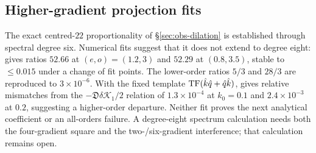 \subsection{Higher-gradient projection fits}\label{app:projection-fits}
The exact centred-$22$ proportionality of \S\ref{sec:obs-dilation} is established through
spectral degree six. Numerical fits suggest that it does not extend to degree eight:
 gives ratios $52.66$ at $(e,o)=(1.2,3)$ and
$52.29$ at $(0.8,3.5)$, stable to $\le0.015$ under a change of fit points. The lower-order
ratios $5/3$ and $28/3$ are reproduced to $3\times10^{-6}$.
With the fixed template $\operatorname{TF}(\hat k\hat q+\hat q\hat k)$,
 gives relative mismatches from the
$-\mathfrak D\delta\mathcal K_1/2$ relation of $1.3\times10^{-4}$ at $k_0=0.1$ and
$2.4\times10^{-3}$ at $0.2$, suggesting a higher-order departure.
Neither fit proves the next analytical coefficient or an all-orders failure. A degree-eight
spectrum calculation needs both the four-gradient square and the two-/six-gradient
interference; that calculation remains open.

